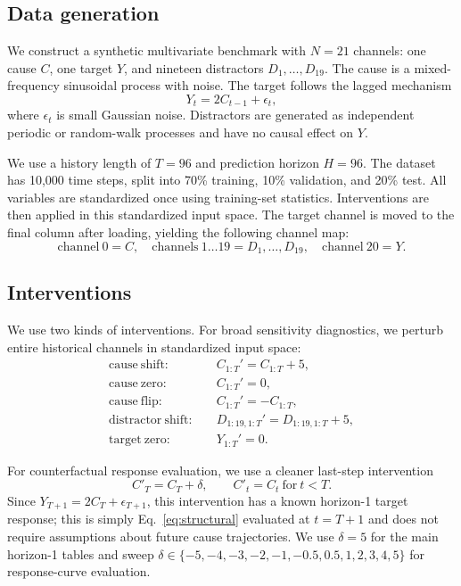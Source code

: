 \documentclass{article}
\begin{document}
\subsection{Data generation}

We construct a synthetic multivariate benchmark with $N=21$ channels:
one cause $C$, one target $Y$, and nineteen distractors $D_1,\ldots,D_{19}$.
The cause is a mixed-frequency sinusoidal process with noise. The target follows
the lagged mechanism
\begin{equation}
Y_t = 2 C_{t-1} + \epsilon_t,
\end{equation}
where $\epsilon_t$ is small Gaussian noise. Distractors are generated as independent
periodic or random-walk processes and have no causal effect on $Y$.

We use a history length of $T=96$ and prediction horizon $H=96$. The dataset has
10,000 time steps, split into 70\% training, 10\% validation, and 20\% test.
All variables are standardized once using training-set statistics. Interventions are
then applied in this standardized input space. The target channel is moved to the
final column after loading, yielding the following channel map:
\begin{equation}
\mathrm{channel}\ 0 = C, \quad
\mathrm{channels}\ 1\ldots 19 = D_1,\ldots,D_{19}, \quad
\mathrm{channel}\ 20 = Y.
\end{equation}

\subsection{Interventions}

We use two kinds of interventions. For broad sensitivity diagnostics, we perturb
entire historical channels in standardized input space:
\begin{align}
\mathrm{cause\ shift:} \quad & C_{1:T}' = C_{1:T} + 5, \\
\mathrm{cause\ zero:} \quad & C_{1:T}' = 0, \\
\mathrm{cause\ flip:} \quad & C_{1:T}' = -C_{1:T}, \\
\mathrm{distractor\ shift:} \quad & D_{1:19,1:T}' = D_{1:19,1:T} + 5, \\
\mathrm{target\ zero:} \quad & Y_{1:T}' = 0.
\end{align}

For counterfactual response evaluation, we use a cleaner last-step intervention
\begin{equation}
C'_T = C_T + \delta,\qquad C'_t=C_t \ \mathrm{for}\ t<T.
\end{equation}
Since $Y_{T+1}=2C_T+\epsilon_{T+1}$, this intervention has a known horizon-1 target
response; this is simply Eq.~\eqref{eq:structural} evaluated at $t=T+1$ and does
not require assumptions about future cause trajectories. We use
$\delta=5$ for the main horizon-1 tables and sweep
$\delta \in \{-5,-4,-3,-2,-1,-0.5,0.5,1,2,3,4,5\}$ for response-curve evaluation.
\end{document}
